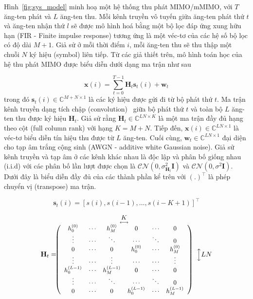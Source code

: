 Hình~\ref{fig:sys_model} minh hoạ một hệ thống thu phát MIMO/mMIMO, với $T$ ăng-ten phát và $L$ ăng-ten thu. Mỗi kênh truyền vô tuyến giữa ăng-ten phát thứ $t$ và ăng-ten nhận thứ $l$ sẽ được mô hình hoá bằng một bộ lọc đáp ứng xung hữu hạn (FIR - Finite impulse response) tương ứng là một véc-tơ của các hệ số bộ lọc có độ dài $M+1$. Giả sử ở mỗi thời điểm $i$, mỗi ăng-ten thu sẽ thu thập một chuỗi $N$ ký hiệu (symbol) liên tiếp. Từ các giả thiết trên, mô hình toán học của hệ thu phát MIMO được biểu diễn dưới dạng ma trận như sau

\begin{equation}
    \mathbf{x}(i) = \sum_{t=0}^{T-1}\mathbf{H}_t \mathbf{s}_t(i) + \mathbf{w}_t
\end{equation}
trong đó $\mathbf{s}_t(i) \in \mathbb{C}^{M+N \times 1}$ là các ký hiệu được gửi đi từ bộ phát thứ $t$. Ma trận kênh truyền dạng tích chập (convolution)~\cite{original} giữa bộ phát thứ $t$ và toàn bộ $L$ ăng-ten thu được ký hiệu $\mathbf{H}_t$. Giả sử rằng $\mathbf{H}_t \in \mathbb{C}^{LN \times K}$ là một ma trận đầy đủ hạng theo cột (full column rank) với hạng $K = M+N$. Tiếp đến, $\mathbf{x}(i) \in \mathbb{C}^{LN \times 1}$ là véc-tơ biểu diễn tín hiệu thu được từ $L$ ăng-ten. Cuối cùng, $\mathbf{w}_t \in \mathbb{C}^{LN \times 1}$ đại diện cho tạp âm trắng cộng sinh (AWGN - additive white Gaussian noise). Giả sử kênh truyền và tạp âm ở các kênh khác nhau là độc lập và phân bố giống nhau (i.i.d) với các phân bố lần lượt được chọn là $\mathcal{CN}(0, \sigma_{\mathbf{H}_t}^2 \mathbf{I})$ và $\mathcal{CN}(0, \sigma^2 \mathbf{I})$. Dưới đây là biểu diễn đầy đủ của các thành phần kể trên với $(.)^\top$ là phép chuyển vị (transpose) ma trận.

\begin{equation}
    \mathbf{s}_t(i) = [s(i), s(i-1),\ldots,s(i-K+1)]^\top
\end{equation}

\begin{equation}
    \small
    \mathbf{H}_t= \hspace{-0.7cm}
    \begin{array}{cc}
         & \underset{\longleftrightarrow}{K}\\
         & \left(\begin{array}{cccccc}
    h_0^{(0)} & \cdots & h_M^{(0)} & 0 & \cdots & 0 \\
    \vdots & \cdots & \ddots & \cdots & \ddots & 0 \\
    0 & \cdots & 0 & h_0^{(0)} & \cdots & h_M^{(0)} \\
    \vdots & \cdots & \vdots & \cdots & \cdots & \vdots \\
    h_0^{(L-1)} & \cdots & h_M^{(L-1)} & 0 & \cdots & 0 \\
    \vdots & \cdots & \ddots & \cdots & \ddots & 0 \\
    0 & \cdots & 0 & h_0^{(L-1)} & \cdots & h_M^{(L-1)}
    \end{array}
    \right) 
    \end{array}
    \Big\updownarrow LN    
\end{equation}

